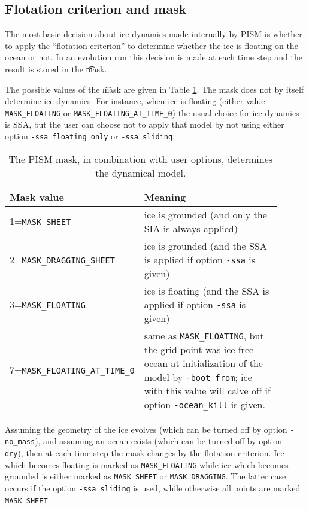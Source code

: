   
\subsection{Flotation criterion and mask} \label{subsect:floatmask}  The most basic decision about ice dynamics made internally by PISM is whether to apply the ``flotation criterion'' to determine whether the ice is floating on the ocean or not.  In an evolution run this decision is made at each time step and the result is stored in the \t{mask}.

The possible values of the \t{mask} are given in Table \ref{tab:maskvals}.  The mask does not by itself determine ice dynamics.  For instance, when ice is floating (either value \texttt{MASK_FLOATING} or \texttt{MASK_FLOATING_AT_TIME_0}) the usual choice for ice dynamics is SSA, but the user can choose not to apply that model by not using either option \texttt{-ssa_floating_only} or \texttt{-ssa_sliding}.

\begin{table}[ht]
\centering
\caption{The PISM mask, in combination with user options, determines the dynamical model.}\label{tab:maskvals} 
\small
\begin{tabular}{p{0.25\linewidth}p{0.65\linewidth}}
\\\toprule
\textbf{Mask value} & \textbf{Meaning}\\\midrule
1=\texttt{MASK_SHEET} & ice is grounded (and only the SIA is always applied) \\
2=\texttt{MASK_DRAGGING_SHEET} & ice is grounded (and the SSA is applied if option \texttt{-ssa} is given) \\
3=\texttt{MASK_FLOATING} & ice is floating (and the SSA is applied if option \texttt{-ssa} is given) \\
7=\texttt{MASK_FLOATING_AT_TIME_0} & same as \texttt{MASK_FLOATING}, but the grid point was ice free ocean at initialization of the model by \texttt{-boot_from}; ice with this value will calve off if option \texttt{-ocean_kill} is given.
\\\bottomrule
\end{tabular}
\normalsize
\end{table}

Assuming the geometry of the ice evolves (which can be turned off by option \texttt{-no_mass}), and assuming an ocean exists (which can be turned off by option \texttt{-dry}), then at each time step the mask changes by the flotation criterion.  Ice which becomes floating is marked as \texttt{MASK_FLOATING} while ice which becomes grounded is either marked as \texttt{MASK_SHEET} or \texttt{MASK_DRAGGING}.  The latter case occurs if the option \texttt{-ssa_sliding} is used, while otherwise all points are marked \texttt{MASK_SHEET}.

